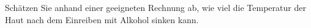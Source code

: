 Schätzen Sie anhand einer geeigneten Rechnung ab, wie viel die Temperatur der Haut nach dem Einreiben mit Alkohol sinken kann.
